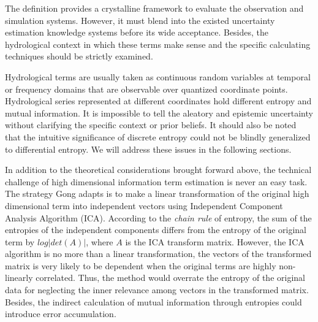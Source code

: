 \documentclass[draft,wrr]{AGUTeX}
\begin{document}
\begin{article}
The definition provides a crystalline framework to evaluate the observation and simulation systems. However, it must blend into the existed uncertainty estimation knowledge systems before its wide  acceptance. Besides, the hydrological context in which these terms make sense and the specific calculating techniques should be strictly examined. 

Hydrological terms are usually taken as continuous random variables at temporal or frequency domains that are observable over quantized coordinate points. Hydrological series represented at different coordinates hold different entropy and mutual information. It is impossible to tell the aleatory and epistemic uncertainty without clarifying the specific context or prior beliefs\citep{weijs2013data}. It should also be noted that the intuitive significance of discrete entropy could not be blindly generalized to differential entropy. We will address these issues in the following sections. 

In addition to the theoretical considerations brought forward above, the technical challenge of high dimensional information term estimation is never an easy task. The strategy Gong adapts is to make a linear transformation of the original high dimensional term into independent vectors using Independent Component Analysis  Algorithm (ICA)\citep{hyvarinen2004independent}. According to the \emph{chain rule} of entropy, the sum of the entropies of the independent components differs from the entropy of the original term by $log|det(A)|$, where $A$ is the ICA transform matrix. However, the ICA algorithm is no more than a linear transformation, the vectors of the transformed matrix is very likely to be dependent when the original terms are highly non-linearly correlated. Thus, the method would overrate the entropy of the original data for neglecting the inner relevance among vectors in the transformed matrix. Besides, the indirect calculation of mutual information through entropies could introduce error accumulation.



\end{article}
\end{document}
